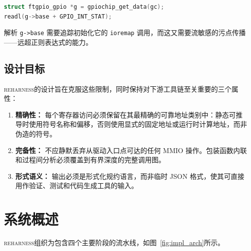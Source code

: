 \documentclass[sigplan, screen, review, anonymous]{acmart}
\newcommand{\reharness}{\textsc{reharness}}
\begin{document}
\begin{lstlisting}[language=C]
struct ftgpio_gpio *g = gpiochip_get_data(gc);
readl(g->base + GPIO_INT_STAT);
\end{lstlisting}

解析 \texttt{g->base} 需要追踪初始化它的 \texttt{ioremap} 调用，而这又需要流敏感的污点传播——远超正则表达式的能力。

\subsection{设计目标}

\reharness 的设计旨在克服这些限制，同时保持对下游工具链至关重要的三个属性：

\begin{enumerate}
\item \textbf{精确性：} 每个寄存器访问必须保留在其最精确的可靠地址类别中：静态可推导时使用符号名称和偏移，否则使用显式的固定地址或运行时计算地址，而非伪造的符号。
\item \textbf{完备性：} 不应静默丢弃从驱动入口点可达的任何 MMIO 操作。包装函数内联和过程间分析必须覆盖到有界深度的完整调用图。
\item \textbf{形式语义：} 输出必须是形式化规约语言，而非临时 JSON 格式，使其可直接用作验证、测试和代码生成工具的输入。
\end{enumerate}

\section{系统概述}

\reharness 组织为包含四个主要阶段的流水线，如图~\ref{fig:impl_arch}所示。
\end{document}
